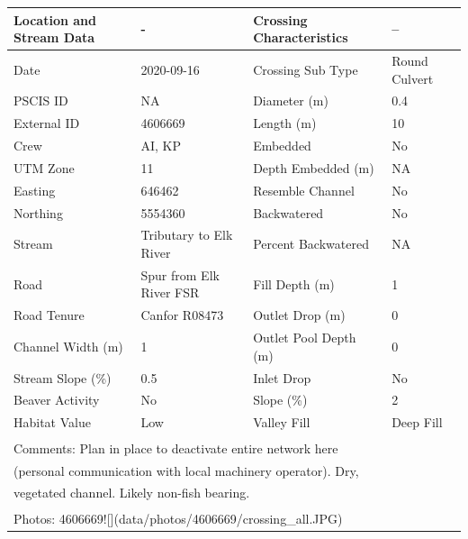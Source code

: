 \documentclass[
]{book}
\begin{document}
\begin{tabular}{l|l|l|l}
\hline
Location and Stream Data & - & Crossing Characteristics & --\\
\hline
Date & 2020-09-16 & Crossing Sub Type & Round Culvert\\
\hline
PSCIS ID & NA & Diameter (m) & 0.4\\
\hline
External ID & 4606669 & Length (m) & 10\\
\hline
Crew & AI, KP & Embedded & No\\
\hline
UTM Zone & 11 & Depth Embedded (m) & NA\\
\hline
Easting & 646462 & Resemble Channel & No\\
\hline
Northing & 5554360 & Backwatered & No\\
\hline
Stream & Tributary to Elk River & Percent Backwatered & NA\\
\hline
Road & Spur from Elk River FSR & Fill Depth (m) & 1\\
\hline
Road Tenure & Canfor R08473 & Outlet Drop (m) & 0\\
\hline
Channel Width (m) & 1 & Outlet Pool Depth (m) & 0\\
\hline
Stream Slope (\%) & 0.5 & Inlet Drop & No\\
\hline
Beaver Activity & No & Slope (\%) & 2\\
\hline
Habitat Value & Low & Valley Fill & Deep Fill\\
\hline
\multicolumn{4}{l}{\textsuperscript{} Comments: Plan in place to deactivate entire network here}\\
\multicolumn{4}{l}{(personal communication with local machinery operator). Dry,}\\
\multicolumn{4}{l}{vegetated channel. Likely non-fish bearing.}\\
\multicolumn{4}{l}{\textsuperscript{} Photos: 4606669![](data/photos/4606669/crossing\_all.JPG)}\\
\end{tabular}
\end{document}
